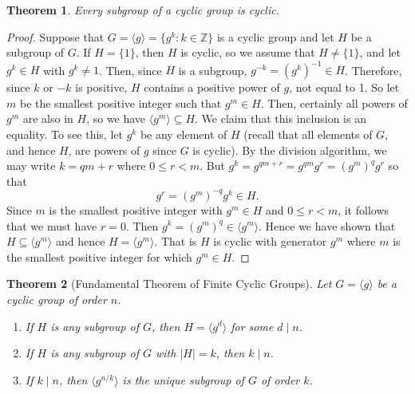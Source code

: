 \documentclass[11pt]{article}
\newcommand{\Z} {{\mathbb Z}}
\newcommand{\divides}{\ensuremath{\mid}}
\theoremstyle{plain}
\newtheorem{thm}{Theorem}%
\theoremstyle{definition}
\begin{document}
\begin{thm}
\label{thm:9}   Every subgroup of a cyclic group is cyclic.
\end{thm}

\begin{proof}
Suppose that $G=\langle g\rangle =\{g^k: k\in \Z\}$ is a cyclic
group and let $H$ be a subgroup of $G$.  If $H=\{1\}$, then $H$ is
cyclic, so we assume that $H\ne \{1\}$, and let $g^k\in H$ with
$g^k\ne 1$.  Then, since $H$ is a subgroup, $g^{-k} =
(g^k)^{-1}\in H$.  Therefore, since $k$ or $-k$ is positive,  $H$
contains a positive power of $g$, not equal to 1.  So let $m$ be
the smallest positive integer such that $g^m\in H$.  Then,
certainly all powers of $g^m$ are also in $H$, so we have $\langle
g^m\rangle \subseteq H$.  We claim that this inclusion is an
equality.  To see this, let $g^k$ be any element of $H$ (recall
that all elements of $G$, and hence $H$, are powers of $g$ since
$G$ is cyclic).  By the division algorithm, we may write $k=qm+r$
where $0\le r<m$.  But $g^k=g^{qm+r}=g^{qm}g^r=(g^m)^qg^r$ so that
$$g^r=(g^m)^{-q}g^k\in H.$$ Since $m$ is the smallest positive
integer with $g^m\in H$ and $0\le r<m$, it follows that we must
have $r=0$.  Then $g^k=(g^m)^q\in \langle g^m\rangle$. Hence we
have shown that $H\subseteq \langle g^m\rangle$ and hence
$H=\langle g^m\rangle$.  That is $H$ is cyclic with generator
$g^m$ where $m$ is the smallest positive integer for which $g^m
\in H$.
\end{proof}

\begin{thm}[Fundamental Theorem of Finite Cyclic Groups]
\label{thm:10}
Let $G=\langle g\rangle$ be a cyclic group of order $n$.
\begin{enumerate}
\item  If $H$ is any subgroup of $G$, then $H=\langle g^d\rangle$ for some $d\divides n$.
\item  If $H$ is any subgroup of $G$ with $|H|=k$, then $k\divides n$.
\item  If $k\divides n$, then $\langle g^{n/k}\rangle$ is the unique subgroup
of $G$ of order $k$.
\end{enumerate}
\end{thm}
\end{document}
